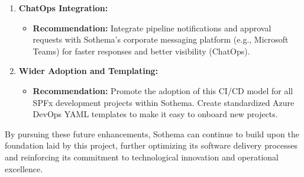 \begin{enumerate}
\begin{itemize}
    \end{itemize}
    \item \textbf{ChatOps Integration:}
    \begin{itemize}
        \item \textbf{Recommendation:} Integrate pipeline notifications and approval requests with Sothema's corporate messaging platform (e.g., Microsoft Teams) for faster responses and better visibility (ChatOps).
    \end{itemize}
    \item \textbf{Wider Adoption and Templating:}
    \begin{itemize}
        \item \textbf{Recommendation:} Promote the adoption of this CI/CD model for all SPFx development projects within Sothema. Create standardized Azure DevOps YAML templates to make it easy to onboard new projects.
    \end{itemize}
\end{enumerate}

By pursuing these future enhancements, Sothema can continue to build upon the foundation laid by this project, further optimizing its software delivery processes and reinforcing its commitment to technological innovation and operational excellence.